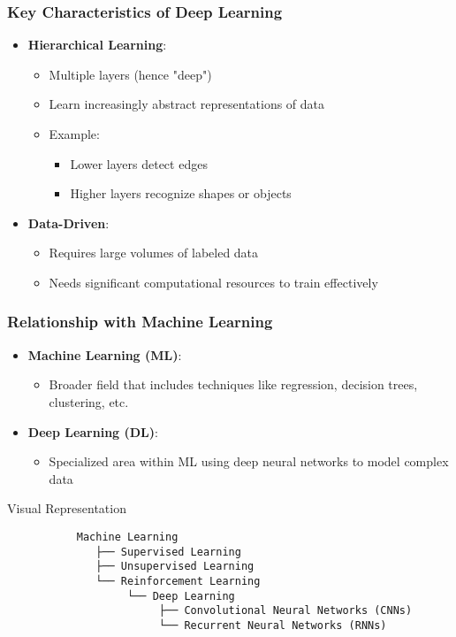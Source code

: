 \documentclass[aspectratio=169]{beamer}
\begin{document}
\begin{frame}[fragile]
    \frametitle{Key Characteristics of Deep Learning}
    \begin{itemize}
        \item \textbf{Hierarchical Learning}: 
        \begin{itemize}
            \item Multiple layers (hence "deep")
            \item Learn increasingly abstract representations of data
            \item Example: 
            \begin{itemize}
                \item Lower layers detect edges
                \item Higher layers recognize shapes or objects
            \end{itemize}
        \end{itemize}
        
        \item \textbf{Data-Driven}: 
        \begin{itemize}
            \item Requires large volumes of labeled data
            \item Needs significant computational resources to train effectively
        \end{itemize}
    \end{itemize}
\end{frame}

\begin{frame}[fragile]
    \frametitle{Relationship with Machine Learning}
    \begin{itemize}
        \item \textbf{Machine Learning (ML)}: 
        \begin{itemize}
            \item Broader field that includes techniques like regression, decision trees, clustering, etc.
        \end{itemize}
        
        \item \textbf{Deep Learning (DL)}: 
        \begin{itemize}
            \item Specialized area within ML using deep neural networks to model complex data
        \end{itemize}
    \end{itemize}
    
    \begin{block}{Visual Representation}
        \begin{verbatim}
           Machine Learning
              ├── Supervised Learning
              ├── Unsupervised Learning
              └── Reinforcement Learning
                   └── Deep Learning
                        ├── Convolutional Neural Networks (CNNs) 
                        └── Recurrent Neural Networks (RNNs)
        \end{verbatim}
    \end{block}
\end{frame}
\end{document}
